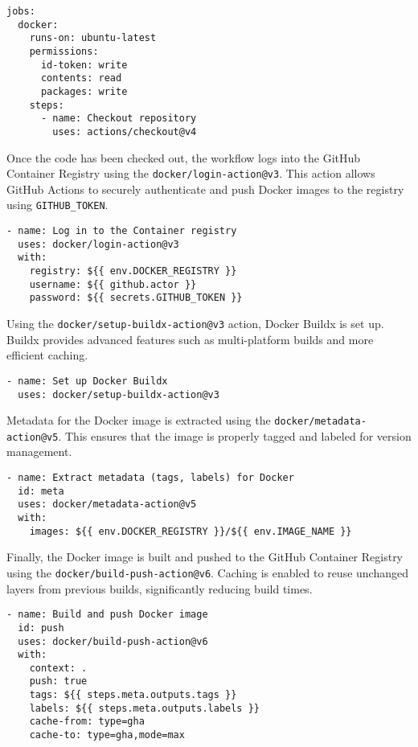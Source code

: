 \begin{lstlisting}[caption={Job Setup and Repository Checkout}]
jobs:
  docker:
    runs-on: ubuntu-latest
    permissions:
      id-token: write
      contents: read
      packages: write
    steps:
      - name: Checkout repository
        uses: actions/checkout@v4
\end{lstlisting}

Once the code has been checked out, the workflow logs into the GitHub Container
Registry using the \texttt{docker/login-action@v3}. This action allows GitHub
Actions to securely authenticate and push Docker images to the registry using
\texttt{GITHUB\_TOKEN}.

\begin{lstlisting}[caption={Logging into the GitHub Container Registry}]
- name: Log in to the Container registry
  uses: docker/login-action@v3
  with:
    registry: ${{ env.DOCKER_REGISTRY }}
    username: ${{ github.actor }}
    password: ${{ secrets.GITHUB_TOKEN }}
\end{lstlisting}

Using the \texttt{docker/setup-buildx-action@v3} action, Docker Buildx is set up.
Buildx provides advanced features such as
multi-platform builds and more efficient caching.

\begin{lstlisting}[caption={Setting up Docker Buildx}]
- name: Set up Docker Buildx
  uses: docker/setup-buildx-action@v3
\end{lstlisting}

Metadata for the Docker image is extracted using the
\texttt{docker/metadata-action@v5}. This ensures that the image is properly tagged
and labeled for version management.

\begin{lstlisting}[caption={Extracting Metadata for Docker Image}]
- name: Extract metadata (tags, labels) for Docker
  id: meta
  uses: docker/metadata-action@v5
  with:
    images: ${{ env.DOCKER_REGISTRY }}/${{ env.IMAGE_NAME }}
\end{lstlisting}

Finally, the Docker image is built and pushed to the GitHub Container Registry using
the \texttt{docker/build-push-action@v6}. Caching is enabled to reuse unchanged
layers from previous builds, significantly reducing build times.

\begin{lstlisting}[caption={Building and Pushing the Docker Image}]
- name: Build and push Docker image
  id: push
  uses: docker/build-push-action@v6
  with:
    context: .
    push: true
    tags: ${{ steps.meta.outputs.tags }}
    labels: ${{ steps.meta.outputs.labels }}
    cache-from: type=gha
    cache-to: type=gha,mode=max
\end{lstlisting}

